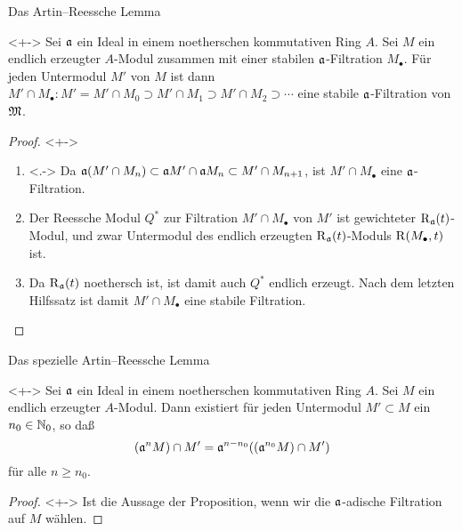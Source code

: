 \begin{frame}{Das Artin--Reessche Lemma}
	\begin{proposition}<+->
		Sei \(\mathfrak{a}\) ein Ideal in einem noetherschen kommutativen Ring
		\(A\). Sei \(M\) ein endlich erzeugter \(A\)-Modul zusammen mit einer
		stabilen \(\mathfrak{a}\)-Filtration \(M_\bullet\). Für jeden Untermodul
		\(M'\) von \(M\) ist dann \(M' \cap M_\bullet\colon M' = M' \cap M_0
		\supset M' \cap M_1 \supset M' \cap M_2 \supset \dotsb\) eine
		stabile \(\mathfrak{a}\)-Filtration von \(\mathfrak{M}\).
	\end{proposition}
	\begin{proof}<+->
		\begin{enumerate}[<+->]
		\item<.->
			Da \(\mathfrak{a} (M' \cap M_n) \subset \mathfrak{a} M' \cap \mathfrak{a} M_n
			\subset M' \cap M_{n + 1}\), ist \(M' \cap M_\bullet\) eine
			\(\mathfrak{a}\)-Filtration.
		\item
			Der Reessche Modul \(Q^*\) zur Filtration \(M' \cap M_\bullet\)
			von \(M'\) ist gewichteter \(\operatorname{R}_{\mathfrak{a}}(t)\)-Modul, und zwar
			Untermodul des endlich erzeugten \(\operatorname{R}_{\mathfrak{a}}(t)\)-Moduls
			\(\operatorname{R}(M_\bullet, t)\) ist.
		\item
			Da \(\operatorname{R}_{\mathfrak{a}}(t)\) noethersch ist, ist damit auch
			\(Q^*\) endlich erzeugt. Nach dem letzten Hilfssatz ist damit
			\(M' \cap M_\bullet\) eine stabile Filtration.
			\qedhere
		\end{enumerate}
	\end{proof}
\end{frame}

\begin{frame}{Das spezielle Artin--Reessche Lemma}
	\begin{corollary}<+->
		Sei \(\mathfrak{a}\) ein Ideal in einem noetherschen kommutativen Ring \(A\).
		Sei \(M\) ein endlich erzeugter \(A\)-Modul. Dann existiert für jeden Untermodul \(M' \subset M\)
		ein \(n_0 \in \mathbb N_0\),
		so daß
		\[
			(\mathfrak{a}^n M) \cap M' = \mathfrak{a}^{n - n_0} ((\mathfrak{a}^{n_0} M) \cap M')
		\]
		für alle \(n \ge n_0\).
	\end{corollary}
	\begin{proof}<+->
		Ist die Aussage der Proposition, wenn wir die \(\mathfrak{a}\)-adische Filtration
		auf \(M\) wählen.
	\end{proof}
\end{frame}

